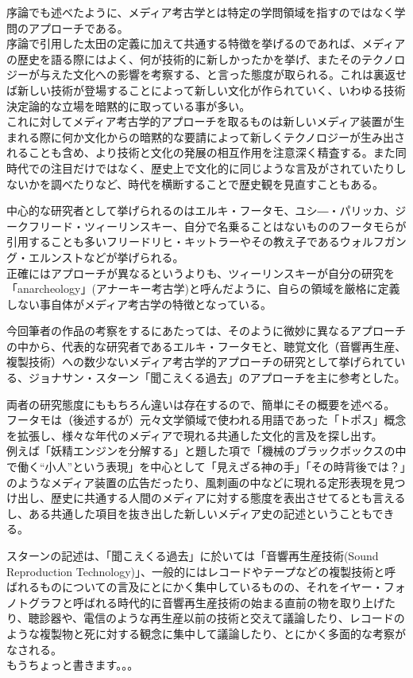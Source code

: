 \documentclass[a4paper,report]{jsbook}
\begin{document}
序論でも述べたように、メディア考古学とは特定の学問領域を指すのではなく学問のアプローチである。\\
序論で引用した太田の定義に加えて共通する特徴を挙げるのであれば、メディアの歴史を語る際にはよく、何が技術的に新しかったかを挙げ、またそのテクノロジーが与えた文化への影響を考察する、と言った態度が取られる。これは裏返せば新しい技術が登場することによって新しい文化が作られていく、いわゆる技術決定論的な立場を暗黙的に取っている事が多い。\\
これに対してメディア考古学的アプローチを取るものは新しいメディア装置が生まれる際に何か文化からの暗黙的な要請によって新しくテクノロジーが生み出されることも含め、より技術と文化の発展の相互作用を注意深く精査する。また同時代での注目だけではなく、歴史上で文化的に同じような言及がされていたりしないかを調べたりなど、時代を横断することで歴史観を見直すこともある。

中心的な研究者として挙げられるのはエルキ・フータモ、ユシ―・パリッカ、ジークフリード・ツィーリンスキー、自分で名乗ることはないもののフータモらが引用することも多いフリードリヒ・キットラーやその教え子であるウォルフガング・エルンストなどが挙げられる。\\
正確にはアプローチが異なるというよりも、ツィーリンスキーが自分の研究を「anarcheology」(アナーキー考古学)と呼んだように、自らの領域を厳格に定義しない事自体がメディア考古学の特徴となっている。

今回筆者の作品の考察をするにあたっては、そのように微妙に異なるアプローチの中から、代表的な研究者であるエルキ・フータモと、聴覚文化（音響再生産、複製技術）への数少ないメディア考古学的アプローチの研究として挙げられている、ジョナサン・スターン「聞こえくる過去」\autocite{o_audiblepast}のアプローチを主に参考とした。

両者の研究態度にももちろん違いは存在するので、簡単にその概要を述べる。\\
フータモは（後述するが）元々文学領域で使われる用語であった「トポス」概念を拡張し、様々な年代のメディアで現れる共通した文化的言及を探し出す。\\
例えば「妖精エンジンを分解する」と題した項で「機械のブラックボックスの中で働く``小人''という表現」を中心として「見えざる神の手」「その時背後では？」のようなメディア装置の広告だったり、風刺画の中などに現れる定形表現を見つけ出し、歴史に共通する人間のメディアに対する態度を表出させてるとも言えるし、ある共通した項目を抜き出した新しいメディア史の記述ということもできる。

スターンの記述は、「聞こえくる過去」に於いては「音響再生産技術(Sound
Reproduction
Technology)」、一般的にはレコードやテープなどの複製技術と呼ばれるものについての言及にとにかく集中しているものの、それをイヤー・フォノトグラフと呼ばれる時代的に音響再生産技術の始まる直前の物を取り上げたり、聴診器や、電信のような再生産以前の技術と交えて議論したり、レコードのような複製物と死に対する観念に集中して議論したり、とにかく多面的な考察がなされる。\\
もうちょっと書きます。。。
\end{document}
